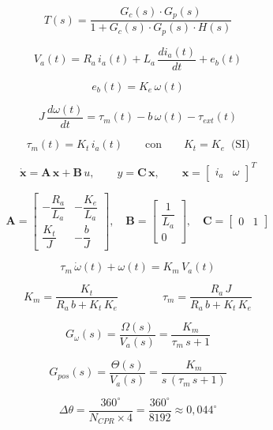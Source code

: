 \documentclass[12pt]{article}
\begin{document}
\[ T(s) = \frac{G_c(s) \cdot G_p(s)}{1 + G_c(s) \cdot G_p(s) \cdot H(s)} \]

\[ V_a(t) = R_a \, i_a(t) + L_a \, \frac{di_a(t)}{dt} + e_b(t) \]

\[ e_b(t) = K_e \, \omega(t) \]

\[ J \, \frac{d\omega(t)}{dt} = \tau_m(t) - b \, \omega(t) - \tau_{ext}(t) \]

\[ \tau_m(t) = K_t \, i_a(t) \qquad\text{con}\qquad K_t = K_e \;\;\text{(SI)} \]

\[ \dot{\mathbf{x}} = \mathbf{A} \, \mathbf{x} + \mathbf{B} \, u, \qquad y = \mathbf{C} \, \mathbf{x}, \qquad \mathbf{x} = \begin{bmatrix} i_a & \omega \end{bmatrix}^T \]

\[ \mathbf{A} = \begin{bmatrix} -\dfrac{R_a}{L_a} & -\dfrac{K_e}{L_a} \\[8pt] \dfrac{K_t}{J} & -\dfrac{b}{J} \end{bmatrix}, \quad \mathbf{B} = \begin{bmatrix} \dfrac{1}{L_a} \\[8pt] 0 \end{bmatrix}, \quad \mathbf{C} = \begin{bmatrix} 0 & 1 \end{bmatrix} \]

\[ \tau_m \, \dot{\omega}(t) + \omega(t) = K_m \, V_a(t) \]

\[ K_m = \frac{K_t}{R_a \, b + K_t \, K_e} \qquad\qquad \tau_m = \frac{R_a \, J}{R_a \, b + K_t \, K_e} \]

\[ G_{\omega}(s) = \frac{\Omega(s)}{V_a(s)} = \frac{K_m}{\tau_m \, s + 1} \]

\[ G_{pos}(s) = \frac{\Theta(s)}{V_a(s)} = \frac{K_m}{s \, (\tau_m \, s + 1)} \]

\[ \Delta\theta = \frac{360^{\circ}}{N_{CPR} \times 4} = \frac{360^{\circ}}{8192} \approx 0{,}044^{\circ} \]
\end{document}

